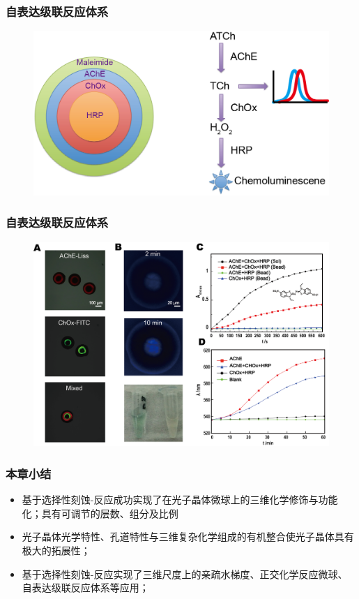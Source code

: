 \documentclass{beamer}
\begin{document}
\begin{frame}
  \frametitle{自表达级联反应体系}
  \begin{figure}
    \begin{center}
      \includegraphics[width=\linewidth]{figures/ch3/cascade.png}
    \end{center}
  \end{figure}
\end{frame}
\begin{frame}
  \frametitle{自表达级联反应体系}
  \begin{figure}
    \begin{center}
      \includegraphics[width=0.9\linewidth]{figures/ch3/cascade-res.png}
    \end{center}
  \end{figure}
\end{frame}

\begin{frame}
  \frametitle{本章小结}
  \begin{itemize}
    \item
    基于选择性刻蚀-反应成功实现了在光子晶体微球上的三维化学修饰与功能化；具有可调节的层数、组分及比例
    \item
    光子晶体光学特性、孔道特性与三维复杂化学组成的有机整合使光子晶体具有极大的拓展性；
    \item
    基于选择性刻蚀-反应实现了三维尺度上的亲疏水梯度、正交化学反应微球、自表达级联反应体系等应用；
  \end{itemize}
\end{frame}
\end{document}
